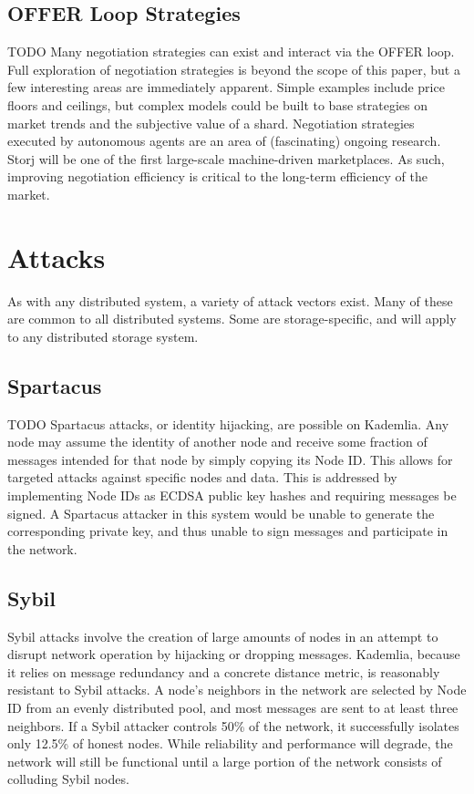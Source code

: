 \documentclass[a4paper,10pt]{article}
\newcommand{\todo}[1]{{\color{red} TODO #1}}
\begin{document}
\subsection{OFFER Loop Strategies}

\todo{
Many negotiation strategies can exist and interact via the OFFER loop. Full
exploration of negotiation strategies is beyond the scope of this paper, but a
few interesting areas are immediately apparent. Simple examples include price
floors and ceilings, but complex models could be built to base strategies on
market trends and the subjective value of a shard. Negotiation strategies
executed by autonomous agents are an area of (fascinating) ongoing research.
Storj will be one of the first large-scale machine-driven marketplaces. As such,
improving negotiation efficiency is critical to the long-term efficiency of the
market.
}

\newpage
\appendix

\section{Attacks}

As with any distributed system, a variety of attack vectors exist. Many of these
are common to all distributed systems. Some are storage-specific, and will apply
to any distributed storage system.

\subsection{Spartacus}

\todo{
Spartacus attacks, or identity hijacking, are possible on Kademlia. Any node may
assume the identity of another node and receive some fraction of messages
intended for that node by simply copying its Node ID. This allows for targeted
attacks against specific nodes and data. This is addressed by implementing Node
IDs as ECDSA public key hashes and requiring messages be signed. A Spartacus
attacker in this system would be unable to generate the corresponding private
key, and thus unable to sign messages and participate in the network.
}

\subsection{Sybil}

Sybil attacks involve the creation of large amounts of nodes in an attempt to
disrupt network operation by hijacking or dropping messages. Kademlia, because
it relies on message redundancy and a concrete distance metric, is reasonably
resistant to Sybil attacks. A node’s neighbors in the network are selected by
Node ID from an evenly distributed pool, and most messages are sent to at least
three neighbors. If a Sybil attacker controls 50\% of the network, it
successfully isolates only 12.5\% of honest nodes. While reliability and
performance will degrade, the network will still be functional until a large
portion of the network consists of colluding Sybil nodes.
\end{document}
